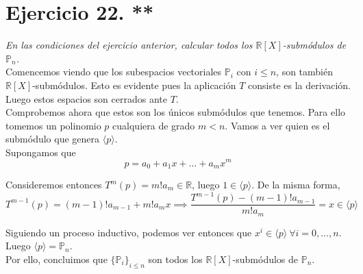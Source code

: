 \section{Ejercicio 22. **} \textit{En las condiciones del ejercicio anterior, calcular
  todos los \(\mathbb{R}[X]\)-submódulos de \(\mathbb{P}_n\).}\\

Comencemos viendo que los subespacios vectoriales \(\mathbb{P}_i\) con \(i
\leq n\), son también \(\mathbb{R}[X]\)-submódulos. Esto es evidente pues la
aplicación \(T\) consiste es la derivación. Luego estos espacios son cerrados
ante \(T\).\\

Comprobemos ahora que estos son los únicos submódulos que tenemos. Para ello
tomemos un polinomio \(p\) cualquiera de grado \(m < n\). Vamos a ver quien es
el submódulo que genera \(\langle p \rangle\).\\

Supongamos que
\[
  p = a_0 + a_1x + \dots + a_m x^m
\]

Consideremos entonces \(T^m(p) = m!a_m \in \mathbb{R}\), luego \(1 \in \langle p
\rangle\). De la misma forma,
\[T^{m-1}(p) = (m-1)!a_{m-1} + m!a_mx \implies
\frac{T^{m-1}(p) - (m-1)!a_{m-1}}{m!a_m} = x \in \langle p \rangle\]

Siguiendo un proceso inductivo, podemos ver entonces que \(x^i \in \langle p
\rangle \ \forall i = 0,\dots,n\). Luego \(\langle p \rangle = \mathbb{P}_n\).\\

Por ello, concluimos que \(\{\mathbb{P}_i\}_{i\leq n}\) son todos los
\(\mathbb{R}[X]\)-submódulos de \(\mathbb{P}_n\).
